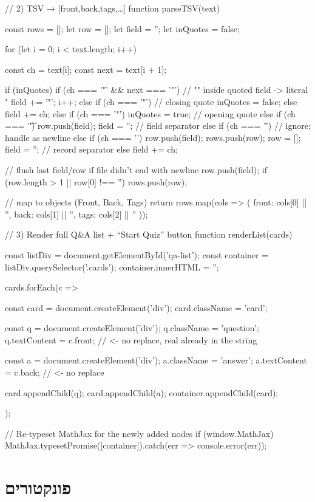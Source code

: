 \documentclass{tstextbook}
\begin{document}
    // 2) TSV → [{front,back,tags},…]
    function parseTSV(text) {
  const rows = [];
  let row = [];
  let field = '';
  let inQuotes = false;

  for (let i = 0; i < text.length; i++) {
    const ch = text[i];
    const next = text[i + 1];

    if (inQuotes) {
      if (ch === '"' && next === '"') {
        // "" inside quoted field -> literal "
        field += '"';
        i++;
      } else if (ch === '"') {
        // closing quote
        inQuotes = false;
      } else {
        field += ch;
      }
    } else {
      if (ch === '"') {
        inQuotes = true;                // opening quote
      } else if (ch === '\t') {
        row.push(field); field = '';    // field separator
      } else if (ch === '\r') {
        // ignore; handle \n as newline
      } else if (ch === '\n') {
        row.push(field); rows.push(row);
        row = []; field = '';           // record separator
      } else {
        field += ch;
      }
    }
  }
  // flush last field/row if file didn't end with newline
  row.push(field);
  if (row.length > 1 || row[0] !== '') rows.push(row);

  // map to objects (Front, Back, Tags)
  return rows.map(cols => ({
    front: cols[0] || '',
    back:  cols[1] || '',
    tags:  cols[2] || ''
  }));
}
// 3) Render full Q&A list + “Start Quiz” button
function renderList(cards) {
  const listDiv = document.getElementById('qa-list');
  const container = listDiv.querySelector('.cards');
  container.innerHTML = '';

  cards.forEach(c => {
    const card = document.createElement('div');
    card.className = 'card';

    const q = document.createElement('div');
    q.className = 'question';
    q.textContent = c.front;   // <- no replace, real \n already in the string

    const a = document.createElement('div');
    a.className = 'answer';
    a.textContent = c.back;    // <- no replace

    card.appendChild(q);
    card.appendChild(a);
    container.appendChild(card);
  });

  // Re-typeset MathJax for the newly added nodes
  if (window.MathJax) {
    MathJax.typesetPromise([container]).catch(err => console.error(err));
  }
}
  \chapter{פונקטורים}
\end{document}

